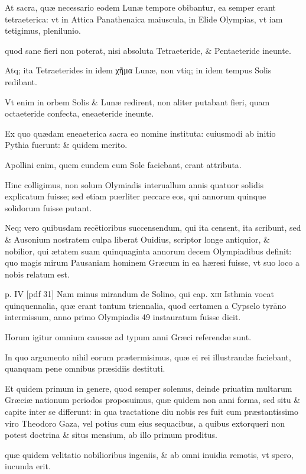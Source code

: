 \begin{parnumbers}
At sacra,
quæ necessario eodem Lunæ tempore obibantur, ea semper erant
tetraeterica: vt in Attica Panathenaica maiuscula, in Elide Olympias,
vt iam tetigimus, plenilunio.

quod sane fieri non poterat, nisi absoluta
Tetraeteride, \& Pentaeteride ineunte.

Atq; ita Tetraeterides
in idem \textgreek{χῆμα} Lunæ, non vtiq; in idem tempus Solis redibant.

Vt
enim in orbem Solis \& Lunæ redirent, non aliter putabant fieri,
quam octaeteride confecta, eneaeteride ineunte.

Ex quo quædam
eneaeterica sacra eo nomine instituta: cuiusmodi ab initio Pythia
fuerunt: \& quidem merito.

Apollini enim, quem eundem cum Sole
faciebant, erant attributa.

Hinc colligimus, non solum Olymiadis
interuallum annis quatuor solidis explicatum fuisse; sed etiam puerliter
peccare eos, qui annorum quinque solidorum fuisse putant.

Neq; vero quibusdam recētioribus succensendum, qui ita censent,
ita scribunt, sed \& Ausonium nostratem culpa liberat Ouidius, scriptor
longe antiquior, \& nobilior, qui ætatem suam quinquaginta annorum
decem Olympiadibus definit: quo magis mirum Pausaniam
hominem Græcum in ea hæresi fuisse, vt suo loco a nobis relatum est.

\clearpage
p. IV [pdf 31]
Nam minus mirandum de Solino, qui cap. \textsc{xiii} Isthmia vocat
quinquennalia, quæ erant tantum triennalia, quod certamen a Cypselo
tyrāno intermissum, anno primo Olympiadis 49 instauratum
fuisse dicit.

Horum igitur omnium caussæ ad typum anni Græci referendæ
sunt.

In quo argumento nihil eorum prætermisimus, quæ
ei rei illustrandæ faciebant, quanquam pene omnibus præsidiis
destituti.

Et quidem primum in genere, quod semper solemus, deinde
priuatim multarum Græciæ nationum periodos proposuimus,
quæ quidem non anni forma, sed situ \& capite inter se differunt: in
qua tractatione diu nobis res fuit cum præstantissimo viro Theodoro
Gaza, vel potius cum eius sequacibus, a quibus extorqueri non
potest doctrina \& situs mensium, ab illo primum proditus. 

quæ quidem
velitatio nobilioribus ingeniis, \& ab omni inuidia remotis, vt
spero, iucunda erit.


\end{parnumbers}
